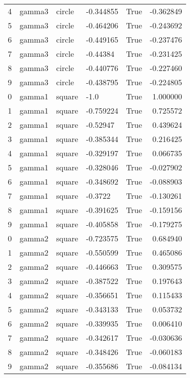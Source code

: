\begin{tabular}{lllllr}
   4 & gamma3 &     circle & -0.344855 &  True & -0.362849 \\
   5 & gamma3 &     circle & -0.464206 &  True & -0.243692 \\
   6 & gamma3 &     circle & -0.449165 &  True & -0.237476 \\
   7 & gamma3 &     circle &  -0.44384 &  True & -0.231425 \\
   8 & gamma3 &     circle & -0.440776 &  True & -0.227460 \\
   9 & gamma3 &     circle & -0.438795 &  True & -0.224805 \\
   0 & gamma1 &     square &      -1.0 &  True &  1.000000 \\
   1 & gamma1 &     square & -0.759224 &  True &  0.725572 \\
   2 & gamma1 &     square &  -0.52947 &  True &  0.439624 \\
   3 & gamma1 &     square & -0.385344 &  True &  0.216425 \\
   4 & gamma1 &     square & -0.329197 &  True &  0.066735 \\
   5 & gamma1 &     square & -0.328046 &  True & -0.027902 \\
   6 & gamma1 &     square & -0.348692 &  True & -0.088903 \\
   7 & gamma1 &     square &   -0.3722 &  True & -0.130261 \\
   8 & gamma1 &     square & -0.391625 &  True & -0.159156 \\
   9 & gamma1 &     square & -0.405858 &  True & -0.179275 \\
   0 & gamma2 &     square & -0.723575 &  True &  0.684940 \\
   1 & gamma2 &     square & -0.550599 &  True &  0.465086 \\
   2 & gamma2 &     square & -0.446663 &  True &  0.309575 \\
   3 & gamma2 &     square & -0.387522 &  True &  0.197643 \\
   4 & gamma2 &     square & -0.356651 &  True &  0.115433 \\
   5 & gamma2 &     square & -0.343133 &  True &  0.053732 \\
   6 & gamma2 &     square & -0.339935 &  True &  0.006410 \\
   7 & gamma2 &     square & -0.342617 &  True & -0.030636 \\
   8 & gamma2 &     square & -0.348426 &  True & -0.060183 \\
   9 & gamma2 &     square & -0.355686 &  True & -0.084134 \\

\end{tabular}
